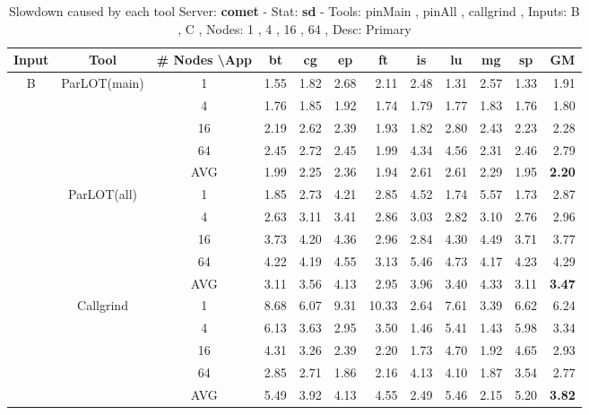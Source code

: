 \begin{table*}[]
\caption{Slowdown caused by each tool Server: \textbf{comet} - 
 Stat: \textbf{sd} - 
 Tools: pinMain , pinAll , callgrind ,  
 Inputs: B , C ,  
 Nodes: 1 , 4 , 16 , 64 ,  
 Desc: Primary}
\label{comet_sd_pMpAcg_BC_itn_p3.5}\begin{center}

\begin{tabular}{|c|c|c|rrrrrrrr|r|}
\hline
Input & Tool & \# Nodes \textbackslash App & \multicolumn{1}{c}{bt} & \multicolumn{1}{c}{cg} & \multicolumn{1}{c}{ep} & \multicolumn{1}{c}{ft} & \multicolumn{1}{c}{is} & \multicolumn{1}{c}{lu} & \multicolumn{1}{c}{mg} & \multicolumn{1}{c|}{sp} & \multicolumn{1}{c|}{GM} \\ \hline
\multirow{15}{*}{B} & \multirow{5}{*}{ParLOT(main)} & 1 & 1.55 & 1.82 & 2.68 & 2.11 & 2.48 & 1.31 & 2.57 & 1.33 & 1.91 \\
 &  & 4 & 1.76 & 1.85 & 1.92 & 1.74 & 1.79 & 1.77 & 1.83 & 1.76 & 1.80 \\
 &  & 16 & 2.19 & 2.62 & 2.39 & 1.93 & 1.82 & 2.80 & 2.43 & 2.23 & 2.28 \\
 &  & 64 & 2.45 & 2.72 & 2.45 & 1.99 & 4.34 & 4.56 & 2.31 & 2.46 & 2.79 \\ \cline{3-12} 
 &  & AVG & 1.99 & 2.25 & 2.36 & 1.94 & 2.61 & 2.61 & 2.29 & 1.95 & \textbf{2.20} \\ \cline{2-12} 
 & \multirow{5}{*}{ParLOT(all)} & 1 & 1.85 & 2.73 & 4.21 & 2.85 & 4.52 & 1.74 & 5.57 & 1.73 & 2.87 \\
 &  & 4 & 2.63 & 3.11 & 3.41 & 2.86 & 3.03 & 2.82 & 3.10 & 2.76 & 2.96 \\
 &  & 16 & 3.73 & 4.20 & 4.36 & 2.96 & 2.84 & 4.30 & 4.49 & 3.71 & 3.77 \\
 &  & 64 & 4.22 & 4.19 & 4.55 & 3.13 & 5.46 & 4.73 & 4.17 & 4.23 & 4.29 \\ \cline{3-12} 
 &  & AVG & 3.11 & 3.56 & 4.13 & 2.95 & 3.96 & 3.40 & 4.33 & 3.11 & \textbf{3.47} \\ \cline{2-12} 
 & \multirow{5}{*}{Callgrind} & 1 & 8.68 & 6.07 & 9.31 & 10.33 & 2.64 & 7.61 & 3.39 & 6.62 & 6.24 \\
 &  & 4 & 6.13 & 3.63 & 2.95 & 3.50 & 1.46 & 5.41 & 1.43 & 5.98 & 3.34 \\
 &  & 16 & 4.31 & 3.26 & 2.39 & 2.20 & 1.73 & 4.70 & 1.92 & 4.65 & 2.93 \\
 &  & 64 & 2.85 & 2.71 & 1.86 & 2.16 & 4.13 & 4.10 & 1.87 & 3.54 & 2.77 \\ \cline{3-12} 
 &  & AVG & 5.49 & 3.92 & 4.13 & 4.55 & 2.49 & 5.46 & 2.15 & 5.20 & \textbf{3.82} \\ \hline

\end{tabular}
\end{center}
\end{table*}

